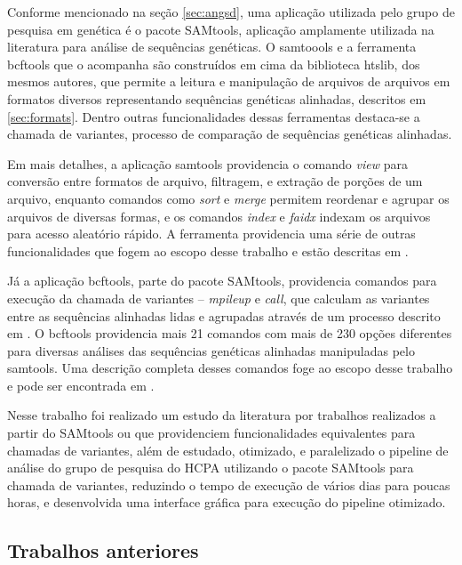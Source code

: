 \documentclass[cic,tc]{iiufrgs}
\begin{document}
Conforme mencionado na seção \ref{sec:angsd}, uma aplicação utilizada pelo
grupo de pesquisa em genética é o pacote SAMtools,\cite{li2009sequence}
aplicação amplamente utilizada na literatura para análise de sequências
genéticas.\cite{danecek2021twelve} O samtoools e a ferramenta bcftools que o
acompanha são construídos em cima da biblioteca htslib, dos mesmos autores, que
permite a leitura e manipulação de arquivos de arquivos em formatos diversos
representando sequências genéticas alinhadas, descritos em \ref{sec:formats}.
Dentro outras funcionalidades dessas ferramentas destaca-se a chamada de
variantes, processo de comparação de sequências genéticas
alinhadas.\cite{danecek2021twelve}

Em mais detalhes, a aplicação samtools providencia o comando \textit{view} para
conversão entre formatos de arquivo, filtragem, e extração de porções de um
arquivo, enquanto comandos como \textit{sort} e \textit{merge} permitem
reordenar e agrupar os arquivos de diversas formas, e os comandos
\textit{index} e \textit{faidx} indexam os arquivos para acesso aleatório
rápido. A ferramenta providencia uma série de outras funcionalidades que fogem
ao escopo desse trabalho e estão descritas em \cite{danecek2021twelve}.

Já a aplicação bcftools, parte do pacote SAMtools, providencia comandos para
execução da chamada de variantes -- \textit{mpileup} e \textit{call}, que
calculam as variantes entre as sequências alinhadas lidas e agrupadas através
de um processo descrito em \cite{li2011improving}. O bcftools providencia mais
21 comandos com mais de 230 opções diferentes para diversas análises das
sequências genéticas alinhadas manipuladas pelo samtools. Uma descrição
completa desses comandos foge ao escopo desse trabalho e pode ser encontrada em
\cite{danecek2021twelve}.

Nesse trabalho foi realizado um estudo da literatura por trabalhos realizados a
partir do SAMtools ou que providenciem funcionalidades equivalentes para
chamadas de variantes, além de estudado, otimizado, e paralelizado o pipeline
de análise do grupo de pesquisa do HCPA utilizando o pacote SAMtools para
chamada de variantes, reduzindo o tempo de execução de vários dias para poucas
horas, e desenvolvida uma interface gráfica para execução do pipeline
otimizado.

\subsection{Trabalhos anteriores}
\label{sec:samant}
\end{document}
